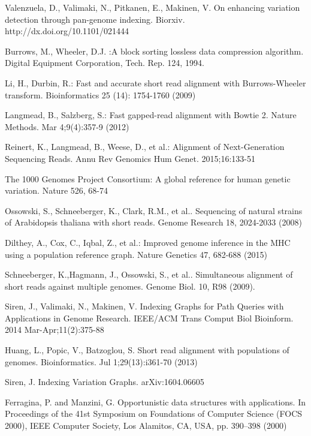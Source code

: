 \documentclass[runningheads,a4paper]{llncs}
\begin{document}
\begin{thebibliography}{4}

 Valenzuela, D., Valimaki, N., Pitkanen, E., Makinen, V. On enhancing variation detection through pan-genome indexing. Biorxiv. http://dx.doi.org/10.1101/021444

 Burrows, M., Wheeler, D.J. :A block sorting lossless data compression algorithm. Digital Equipment Corporation, Tech. Rep. 124, 1994. 

 Li, H., Durbin, R.: Fast and accurate short read alignment with Burrows-Wheeler transform. Bioinformatics 25 (14): 1754-1760 (2009)

 Langmead, B., Salzberg, S.: Fast gapped-read alignment with Bowtie 2. Nature Methods. Mar 4;9(4):357-9 (2012)

 Reinert, K., Langmead, B., Weese, D., et al.: Alignment of Next-Generation Sequencing Reads. Annu Rev Genomics Hum Genet. 2015;16:133-51

 The 1000 Genomes Project Consortium: A global reference for human genetic variation. Nature 526, 68-74

 Ossowski, S., Schneeberger, K., Clark, R.M., et al.. Sequencing of natural strains of Arabidopsis thaliana with short reads. Genome Research 18, 2024-2033 (2008)

 Dilthey, A., Cox, C., Iqbal, Z., et al.: Improved genome inference in the MHC using a population reference graph. Nature Genetics 47, 682-688 (2015)

 Schneeberger, K.,Hagmann, J., Ossowski, S.,  et al.. Simultaneous alignment of short reads against multiple genomes. Genome Biol. 10, R98 (2009).

 Siren, J., Valimaki, N., Makinen, V. Indexing Graphs for Path Queries with Applications in Genome Research. IEEE/ACM Trans Comput Biol Bioinform. 2014 Mar-Apr;11(2):375-88

 Huang, L., Popic, V., Batzoglou, S. Short read alignment with populations of genomes. Bioinformatics. Jul 1;29(13):i361-70 (2013)

 Siren, J. Indexing Variation Graphs. 	arXiv:1604.06605 

 Ferragina, P. and Manzini, G. Opportunistic data structures with applications. In Proceedings of the 41st Symposium on Foundations of Computer Science (FOCS 2000), IEEE Computer Society, Los Alamitos, CA, USA, pp. 390–398 (2000)


\end{thebibliography}
\end{document}
